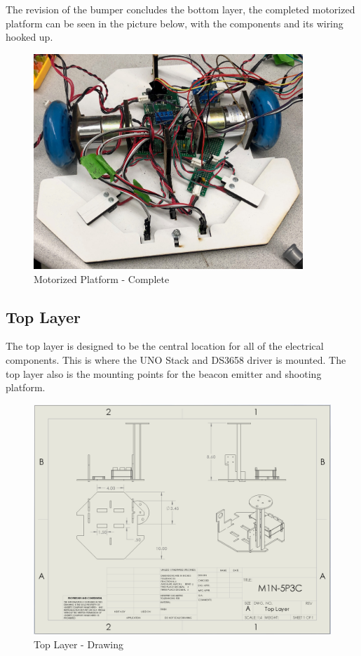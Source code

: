 \documentclass{article}
\begin{document}
The revision of the bumper concludes the bottom layer, the completed motorized platform can be seen in the picture below, with the components and its wiring hooked up.

\begin{figure}[H]
    \centering
    \includegraphics[width = 4in]{MotorizedPlatformComplete.jpg}
    \caption{Motorized Platform - Complete}
    \label{fig:MotorizedPlatformComplete}
\end{figure}

\subsection{Top Layer}
The top layer is designed to be the central location for all of the electrical components. This is where the UNO Stack and DS3658 driver is mounted. The top layer also is the mounting points for the beacon emitter and shooting platform.

\begin{figure}[H]
    \centering
    \includegraphics[width = 5in]{TopLayer.PNG}
    \caption{Top Layer - Drawing}
    \label{fig:TopLayerDrawing}
\end{figure}
\end{document}
